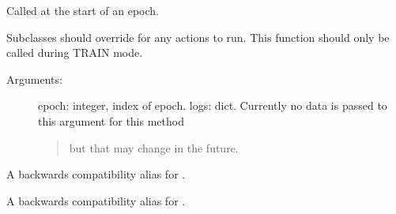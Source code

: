 \documentclass[letterpaper,10pt,english]{sphinxmanual}
\begin{document}
\begin{fulllineitems}
\begin{fulllineitems}
\label{\detokenize{engine/schedulers/cosine_decay:engine.schedulers.cosine_decay.WarmUpCosineDecayScheduler.on_epoch_begin}}
Called at the start of an epoch.

Subclasses should override for any actions to run. This function should only
be called during TRAIN mode.
\begin{description}
\item[{Arguments:}] \leavevmode
epoch: integer, index of epoch.
logs: dict. Currently no data is passed to this argument for this method
\begin{quote}

but that may change in the future.
\end{quote}

\end{description}

\end{fulllineitems}


\begin{fulllineitems}
\label{\detokenize{engine/schedulers/cosine_decay:engine.schedulers.cosine_decay.WarmUpCosineDecayScheduler.on_batch_end}}
A backwards compatibility alias for .

\end{fulllineitems}


\begin{fulllineitems}
\label{\detokenize{engine/schedulers/cosine_decay:engine.schedulers.cosine_decay.WarmUpCosineDecayScheduler.on_batch_begin}}
A backwards compatibility alias for .


\end{fulllineitems}
\end{fulllineitems}
\end{document}
